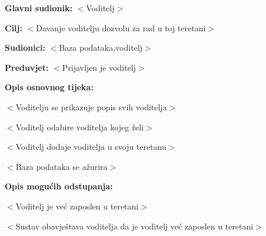 					\noindent {}
					\begin{packed_item}
	
						\item \textbf{Glavni sudionik: } $<$Voditelj$>$
						\item  \textbf{Cilj:} $<$Davanje voditelju dozvolu za rad u toj teretani$>$
						\item  \textbf{Sudionici:} $<$Baza podataka,voditelj$>$
						\item  \textbf{Preduvjet:} $<$Prijavljen je voditelj$>$
						\item  \textbf{Opis osnovnog tijeka:}
						
						\item[] \begin{packed_enum}
	                        \item $<$Voditelju se prikazuje popis svih voditelja$>$
							\item $<$Voditelj odabire voditelja kojeg želi$>$
							\item $<$Voditelj dodaje voditelja u svoju teretanu$>$
							\item $<$Baza podataka se ažurira$>$
						\end{packed_enum}
						
						\item  \textbf{Opis mogućih odstupanja:}
						
						\item[] \begin{packed_item}
	
							\item[1.] $<$Voditelj je već zaposlen u teretani$>$
							\item[] \begin{packed_enum}
								
								\item[a)] $<$Sustav obavještava voditelja da je voditelj već zaposlen u teretani$>$
						
								
							\end{packed_enum}
	
							
						\end{packed_item}
					\end{packed_item}
					
